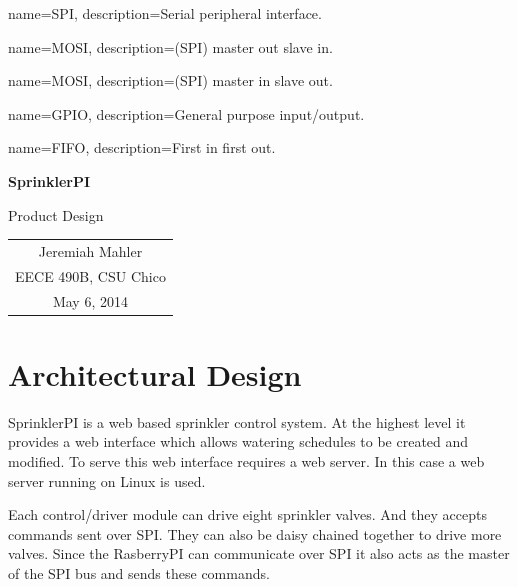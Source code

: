 \documentclass{article}
\begin{document}
\nocite{github_jmahler_sprinklerpi}


{
	name={SPI},
	description={Serial peripheral interface}.
}

{
	name={MOSI},
	description={(SPI) master out slave in}.
}

{
	name={MOSI},
	description={(SPI) master in slave out}.
}

{
	name={GPIO},
	description={General purpose input/output}.
}

{
	name={FIFO},
	description={First in first out}.
}


\vspace*{1.0in}

\centerline{\LARGE \textbf{SprinklerPI}}
\vspace{0.3in}
\centerline{\LARGE Product Design}

\vfill

\begin{center}
\begin{tabular}{c}
Jeremiah Mahler \\
EECE 490B, CSU Chico \\
May 6, 2014
\end{tabular}
\end{center}

\vspace{2in}

\thispagestyle{empty}

\pagebreak

\nocite{rasberrypi}
\thispagestyle{empty}
\tableofcontents

\clearpage
\section{Architectural Design}

SprinklerPI is a web based sprinkler control system.
At the highest level it provides a web interface
which allows watering schedules to be created and modified.
To serve this web interface requires a web server.
In this case a web server running on Linux is used.

Each control/driver module can drive eight sprinkler valves.
And they accepts commands sent over SPI.
They can also be daisy chained together to drive more valves.
Since the RasberryPI can communicate over SPI it also
acts as the master of the SPI bus and sends these commands.
\end{document}
